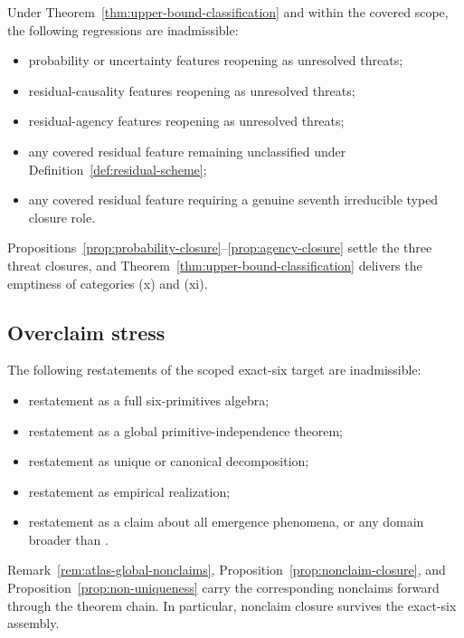 \begin{proposition}\label{prop:residual-stress}
Under Theorem~\ref{thm:upper-bound-classification} and within the covered
scope, the following regressions are inadmissible:
\begin{itemize}[topsep=2pt,itemsep=1pt]
  \item probability or uncertainty features reopening as unresolved
    threats;
  \item residual-causality features reopening as unresolved threats;
  \item residual-agency features reopening as unresolved threats;
  \item any covered residual feature remaining unclassified under
    Definition~\ref{def:residual-scheme};
  \item any covered residual feature requiring a genuine seventh
    irreducible typed closure role.
\end{itemize}
Propositions~\ref{prop:probability-closure}--\ref{prop:agency-closure}
settle the three threat closures, and
Theorem~\ref{thm:upper-bound-classification} delivers the emptiness of
categories (x) and (xi).
\end{proposition}

\subsection{Overclaim stress}\label{subsec:overclaim-stress}

\begin{proposition}\label{prop:overclaim-stress}
The following restatements of the scoped exact-six target are
inadmissible:
\begin{itemize}[topsep=2pt,itemsep=1pt]
  \item restatement as a full six-primitives algebra;
  \item restatement as a global primitive-independence theorem;
  \item restatement as unique or canonical decomposition;
  \item restatement as empirical realization;
  \item restatement as a claim about all emergence phenomena, or any
    domain broader than \FATCD{}.
\end{itemize}
Remark~\ref{rem:atlas-global-nonclaims},
Proposition~\ref{prop:nonclaim-closure}, and
Proposition~\ref{prop:non-uniqueness} carry the corresponding nonclaims
forward through the theorem chain. In particular, nonclaim closure
survives the exact-six assembly.
\end{proposition}

